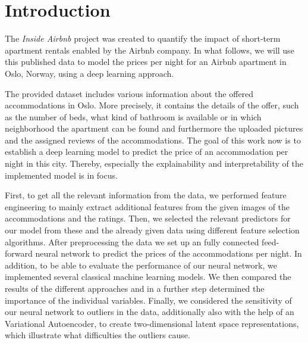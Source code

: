 \section{Introduction}


The \emph{Inside Airbnb} project was created to quantify the impact of short-term apartment rentals enabled by the Airbnb company.
In what follows, we will use this published data to model the prices per night for an Airbnb apartment in Oslo, Norway, using a deep learning approach. 

The provided dataset includes various information about the offered accommodations in Oslo. More precisely, it contains the details of the offer, such as the number of beds, what kind of bathroom is available or in which neighborhood the apartment can be found and furthermore the uploaded pictures and the assigned reviews of the accommodations.
The goal of this work now is to establish a deep learning model to predict the price of an accommodation per night in this city. Thereby, especially the explainability and interpretability of the implemented model is in focus.

First, to get all the relevant information from the data, we performed feature engineering to mainly extract additional features from the given images of the accommodations and the ratings. Then, we selected the relevant predictors for our model from these and the already given data using different feature selection algorithms. After preprocessing the data we set up an fully connected feed-forward neural network to predict the prices of the accommodations per night. In addition, to be able to evaluate the performance of our neural network, we implemented several classical machine learning models. We then compared the results of the different approaches and in a further step determined the importance of the individual variables. Finally, we considered the sensitivity of our neural network to outliers in the data, additionally also with the help of an Variational Autoencoder, to create two-dimensional latent space representations, which illustrate what difficulties the outliers cause.

